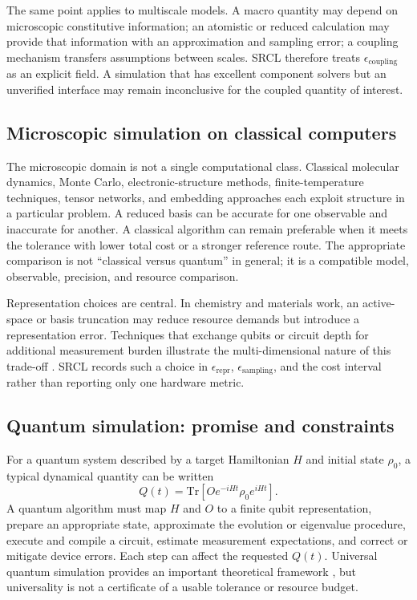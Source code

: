 \documentclass[conference]{../../../../Conference-LaTeX-template_10-17-19/IEEEtran}
\begin{document}
The same point applies to multiscale models. A macro quantity may depend on microscopic constitutive information; an atomistic or reduced calculation may provide that information with an approximation and sampling error; a coupling mechanism transfers assumptions between scales. SRCL therefore treats $\epsilon_{\mathrm{coupling}}$ as an explicit field. A simulation that has excellent component solvers but an unverified interface may remain inconclusive for the coupled quantity of interest.

\subsection{Microscopic simulation on classical computers}
The microscopic domain is not a single computational class. Classical molecular dynamics, Monte Carlo, electronic-structure methods, finite-temperature techniques, tensor networks, and embedding approaches each exploit structure in a particular problem. A reduced basis can be accurate for one observable and inaccurate for another. A classical algorithm can remain preferable when it meets the tolerance with lower total cost or a stronger reference route. The appropriate comparison is not ``classical versus quantum'' in general; it is a compatible model, observable, precision, and resource comparison.

Representation choices are central. In chemistry and materials work, an active-space or basis truncation may reduce resource demands but introduce a representation error. Techniques that exchange qubits or circuit depth for additional measurement burden illustrate the multi-dimensional nature of this trade-off \cite{takeshita2020}. SRCL records such a choice in $\epsilon_{\mathrm{repr}}$, $\epsilon_{\mathrm{sampling}}$, and the cost interval rather than reporting only one hardware metric.

\subsection{Quantum simulation: promise and constraints}
For a quantum system described by a target Hamiltonian $H$ and initial state $\rho_0$, a typical dynamical quantity can be written
\begin{equation}
Q(t)=\mathrm{Tr}\!\left[Oe^{-iHt}\rho_0e^{iHt}\right].
\label{eq:quantum-qoi}
\end{equation}
A quantum algorithm must map $H$ and $O$ to a finite qubit representation, prepare an appropriate state, approximate the evolution or eigenvalue procedure, execute and compile a circuit, estimate measurement expectations, and correct or mitigate device errors. Each step can affect the requested $Q(t)$. Universal quantum simulation provides an important theoretical framework \cite{lloyd1996}, but universality is not a certificate of a usable tolerance or resource budget.
\end{document}
